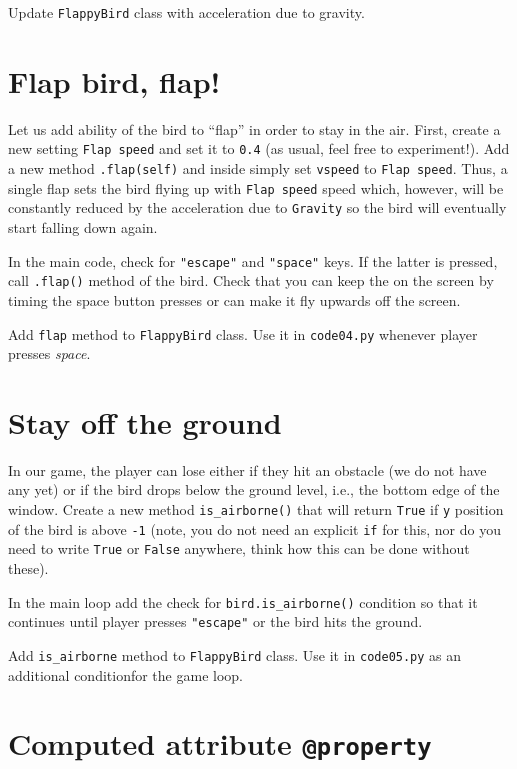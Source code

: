 \documentclass[
]{book}
\begin{document}
Update \texttt{FlappyBird} class with acceleration due to gravity.

\hypertarget{flap-bird-flap}{%
\section{Flap bird, flap!}\label{flap-bird-flap}}

Let us add ability of the bird to ``flap'' in order to stay in the air. First, create a new setting \texttt{Flap\ speed} and set it to \texttt{0.4} (as usual, feel free to experiment!). Add a new method \texttt{.flap(self)} and inside simply set \texttt{vspeed} to \texttt{Flap\ speed}. Thus, a single flap sets the bird flying up with \texttt{Flap\ speed} speed which, however, will be constantly reduced by the acceleration due to \texttt{Gravity} so the bird will eventually start falling down again.

In the main code, check for \texttt{"escape"} and \texttt{"space"} keys. If the latter is pressed, call \texttt{.flap()} method of the bird. Check that you can keep the on the screen by timing the space button presses or can make it fly upwards off the screen.

Add \texttt{flap} method to \texttt{FlappyBird} class.
Use it in \texttt{code04.py} whenever player presses \emph{space}.

\hypertarget{stay-off-the-ground}{%
\section{Stay off the ground}\label{stay-off-the-ground}}

In our game, the player can lose either if they hit an obstacle (we do not have any yet) or if the bird drops below the ground level, i.e., the bottom edge of the window. Create a new method \texttt{is\_airborne()} that will return \texttt{True} if \texttt{y} position of the bird is above \texttt{-1} (note, you do not need an explicit \texttt{if} for this, nor do you need to write \texttt{True} or \texttt{False} anywhere, think how this can be done without these).

In the main loop add the check for \texttt{bird.is\_airborne()} condition so that it continues until player presses \texttt{"escape"} or the bird hits the ground.

Add \texttt{is\_airborne} method to \texttt{FlappyBird} class.
Use it in \texttt{code05.py} as an additional conditionfor the game loop.

\hypertarget{computed-attribute-property}{%
\section{\texorpdfstring{Computed attribute \texttt{@property}}{Computed attribute @property}}\label{computed-attribute-property}}
\end{document}
